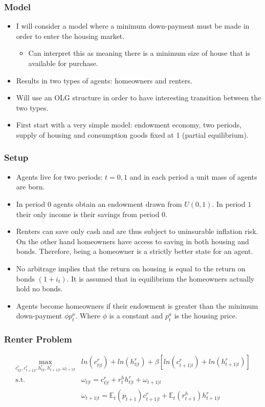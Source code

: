 \documentclass{beamer}
\begin{document}
\begin{frame}
    \frametitle{Model}
    \begin{itemize}
        \item I will consider a model where a minimum down-payment must be made in order to enter the housing market.
        \begin{itemize}
            \item Can interpret this as meaning there is a minimum size of house that is available for purchase.
        \end{itemize}
        \item Results in two types of agents: homeowners and renters.
        \item Will use an OLG structure in order to have interesting transition between the two types.
        \item First start with a very simple model: endowment economy, two periods, supply of housing and consumption goods fixed at 1 (partial equilibrium).
    \end{itemize}
\end{frame}

\begin{frame}
    \frametitle{Setup}
    \begin{itemize}
        \item Agents live for two periods: $t=0,1$ and in each period a unit mass of agents are born.
        \item In period $0$ agents obtain an endowment drawn from $U(0, 1)$. In period $1$ their only income is their savings from period $0$.
        \item Renters can save only cash and are thus subject to uninsurable inflation risk. On the other hand homeowners have access to saving in both housing and bonds. Therefore, being a homeowner is a strictly better state for an agent.
        \item No arbitrage implies that the return on housing is equal to the return on bonds $(1+i_t)$. It is assumed that in equilibrium the homeowners actually hold no bonds.
        \item Agents become homeowners if their endowment is greater than the minimum down-payment $\phi p^a_t$. Where $\phi$ is a constant and $p^a_t$ is the housing price.
    \end{itemize}
\end{frame}

\begin{frame}
    \frametitle{Renter Problem}
    \begin{align}
        \underset{c^r_{t|t}, c^r_{t+1|t}, h^r_{t|t}, h^r_{t+1|t}, \omega_{t+1|t}}{\max} &ln(c^r_{t|t}) + ln(h^r_{t|t}) + \beta[ln(c^r_{t+1|t}) + ln(h^r_{t+1|t})] \nonumber \\
        \text{s.t. }& \omega_{t|t} = c^r_{t|t} + r_{t}^h h^r_{t|t} + \omega_{t+1|t} \nonumber \\
        & \omega_{t+1|t} = \mathbb{E}_t(p_{t+1})c^r_{t+1|t} + \mathbb{E}_t(r^h_{t+1})h^r_{t+1|t}
    \end{align}
\end{frame}
\end{document}
